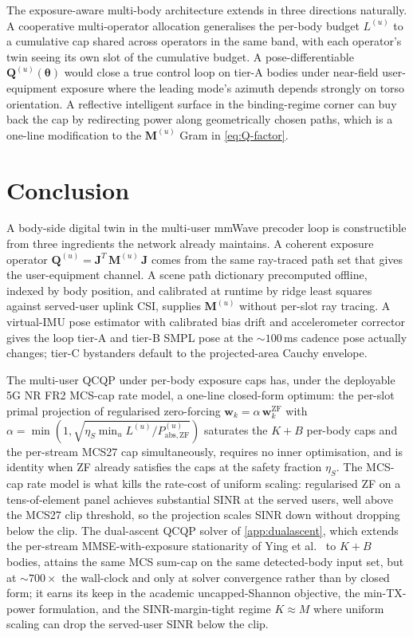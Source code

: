 \documentclass[journal,twocolumn,10pt]{IEEEtran}
\theoremstyle{plain}
\theoremstyle{remark}
\newcommand{\ww}{\mathbf{w}}
\newcommand{\Qmat}{\mathbf{Q}}
\newcommand{\Mmat}{\mathbf{M}}
\newcommand{\Jmat}{\mathbf{J}}
\newcommand{\PabsZF}{P_{\mathrm{abs},\mathrm{ZF}}}
\begin{document}
The exposure-aware multi-body architecture extends in three
directions naturally. A cooperative multi-operator allocation
generalises the per-body budget $L^{(u)}$ to a cumulative cap shared
across operators in the same band, with each operator's twin seeing
its own slot of the cumulative budget. A pose-differentiable
$\Qmat^{(u)}(\bm\theta)$ would close a true control loop on tier-A
bodies under near-field user-equipment exposure where the leading
mode's azimuth depends strongly on torso orientation. A reflective
intelligent surface in the binding-regime corner can buy back the
cap by redirecting power along geometrically chosen paths, which is
a one-line modification to the $\Mmat^{(u)}$ Gram in
\cref{eq:Q-factor}.


\section{Conclusion}\label{sec:conclusion}

A body-side digital twin in the multi-user mmWave precoder loop is
constructible from three ingredients the network already maintains.
A coherent exposure operator
$\Qmat^{(u)} = \Jmat^T\,\Mmat^{(u)}\,\Jmat$ comes from the same
ray-traced path set that gives the user-equipment channel. A scene
path dictionary precomputed offline, indexed by body position, and
calibrated at runtime by ridge least squares against served-user
uplink CSI, supplies $\Mmat^{(u)}$ without per-slot ray tracing. A
virtual-IMU pose estimator with calibrated bias drift and
accelerometer corrector gives the loop tier-A and tier-B SMPL pose
at the $\sim 100\,$ms cadence pose actually changes; tier-C
bystanders default to the projected-area Cauchy envelope.

The multi-user QCQP under per-body exposure caps has, under the
deployable 5G NR FR2 MCS-cap rate model, a one-line closed-form
optimum: the per-slot primal projection of regularised
zero-forcing $\ww_k = \alpha\,\ww_k^{\mathrm{ZF}}$ with $\alpha =
\min(1, \sqrt{\eta_S \min_u L^{(u)}/\PabsZF^{(u)}})$
saturates the $K + B$ per-body caps and the per-stream MCS27 cap
simultaneously, requires no inner optimisation, and is identity
when ZF already satisfies the caps at the safety fraction $\eta_S$.
The MCS-cap rate model is what kills the rate-cost of uniform
scaling: regularised ZF on a tens-of-element panel achieves
substantial SINR at the served users, well above the MCS27 clip
threshold, so the projection scales SINR down without dropping
below the clip. The dual-ascent QCQP solver of \cref{app:dualascent},
which extends the per-stream MMSE-with-exposure stationarity of
Ying et al.~\cite{Ying2017} to $K + B$ bodies, attains the same
MCS sum-cap on the same detected-body input set, but at $\sim
700\times$ the wall-clock and only at solver convergence rather
than by closed form; it earns its keep in the academic
uncapped-Shannon objective, the min-TX-power formulation, and the
SINR-margin-tight regime $K \approx M$ where uniform scaling can
drop the served-user SINR below the clip.
\end{document}
